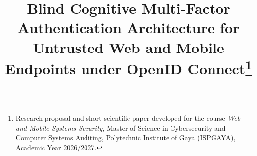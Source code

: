 \title{Blind Cognitive Multi-Factor Authentication Architecture for Untrusted Web and Mobile Endpoints under OpenID Connect\thanks{Research proposal and short scientific paper developed for the course \textit{Web and Mobile Systems Security}, Master of Science in Cybersecurity and Computer Systems Auditing, Polytechnic Institute of Gaya (ISPGAYA), Academic Year 2026/2027.}}

\author{
}

